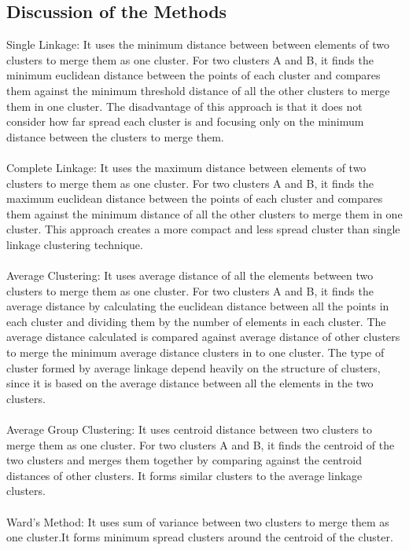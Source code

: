 \documentclass[12pt]{report}
\begin{document}
\subsection{Discussion of the Methods}
Single Linkage: It uses the minimum distance between between elements of two clusters to merge them as one cluster. For two clusters A and B, it finds the minimum euclidean distance between the points of each cluster and compares them against the minimum threshold distance of all the other clusters to merge them in one cluster. The disadvantage of this approach is that it does not consider how far spread each cluster is and focusing only on the minimum distance between the clusters to merge them.\\ \\
Complete Linkage: It uses the maximum distance between elements of two clusters to merge them as one cluster. For two clusters A and B, it finds the maximum euclidean distance between the points of each cluster and compares them against the minimum distance of all the other clusters to merge them in one cluster. This approach creates a more compact and less spread cluster than single linkage clustering technique.\\ \\
Average Clustering: It uses average distance of all the elements between two clusters to merge them as one cluster. For two clusters A and B, it finds the average distance by calculating the euclidean distance between all the points in each cluster and dividing them by the number of elements  in each cluster. The average distance calculated is compared against average distance of other clusters to merge the minimum average distance clusters in to one cluster. The type of cluster formed by average linkage depend heavily on the structure of clusters, since it is based on the average distance between all the elements in the two clusters. \\ \\
Average Group Clustering: It uses centroid distance between two clusters to merge them as one cluster. For two clusters A and B, it finds the centroid of the two clusters and merges them together by comparing against the centroid distances of other clusters. It forms similar clusters to the average linkage clusters.\\ \\
Ward's Method: It uses sum of variance between two clusters to merge them as one cluster.It forms minimum spread clusters around the centroid of the cluster.\\


\end{document}
